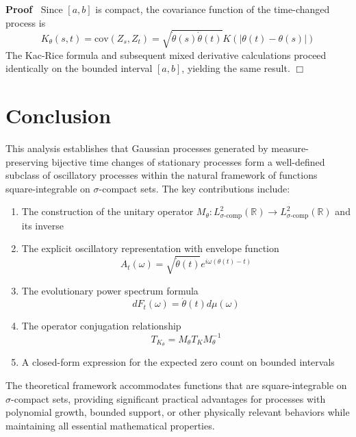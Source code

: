 \documentclass{article}
\newenvironment{proof}{\noindent\textbf{Proof\ }}{\hspace*{\fill}$\Box$\medskip}
\begin{document}
\begin{proof}
  Since $[a, b]$ is compact, the covariance function of the time-changed
  process is
  \begin{equation}
    \label{eq:time_changed_cov} K_{\theta} (s, t) = \mathrm{cov} (Z_s, Z_t) =
    \sqrt{\dot{\theta} (s)  \dot{\theta} (t)} K (| \theta (t) - \theta (s) |)
  \end{equation}
  The Kac-Rice formula and subsequent mixed derivative calculations proceed
  identically on the bounded interval $[a, b]$, yielding the same result.
\end{proof}

\section{Conclusion}

This analysis establishes that Gaussian processes generated by
measure-preserving bijective time changes of stationary processes form a
well-defined subclass of oscillatory processes within the natural framework of
functions square-integrable on $\sigma$-compact sets. The key contributions
include:
\begin{enumerate}
  \item The construction of the unitary operator $M_{\theta} : L^2_{\sigma
  \text{-comp}} (\mathbb{R}) \to L^2_{\sigma \text{-comp}} (\mathbb{R})$ and
  its inverse
  
  \item The explicit oscillatory representation with envelope function
  \begin{equation}
    A_t (\omega) = \sqrt{\dot{\theta} (t)} e^{i \omega (\theta (t) - t)}
  \end{equation}
  \item The evolutionary power spectrum formula
  \begin{equation}
    dF_t (\omega) = \dot{\theta} (t) d \mu (\omega)
  \end{equation}
  \item The operator conjugation relationship
  \begin{equation}
    T_{K_{\theta}} = M_{\theta} T_K M_{\theta}^{- 1}
  \end{equation}
  \item A closed-form expression for the expected zero count on bounded
  intervals
\end{enumerate}
The theoretical framework accommodates functions that are square-integrable on
$\sigma$-compact sets, providing significant practical advantages for
processes with polynomial growth, bounded support, or other physically
relevant behaviors while maintaining all essential mathematical properties.
\end{document}
